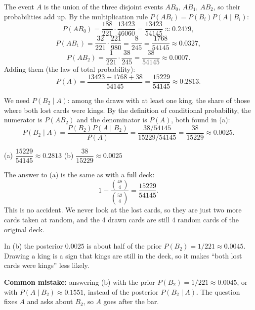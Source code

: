 \begin{solution}
	 The event $A$ is the union of the three disjoint events $AB_0$,
	$AB_1$, $AB_2$, so their probabilities add up. By the multiplication rule
	$P(AB_i)=P(B_i)P(A\mid B_i)$:
	\[ P(AB_0)=\frac{188}{221}\cdot\frac{13423}{46060}=\frac{13423}{54145}\approx0.2479, \]
	\[ P(AB_1)=\frac{32}{221}\cdot\frac{221}{980}=\frac{8}{245}=\frac{1768}{54145}\approx0.0327, \]
	\[ P(AB_2)=\frac{1}{221}\cdot\frac{38}{245}=\frac{38}{54145}\approx0.0007. \]
	Adding them (the law of total probability):
	\[ P(A)=\frac{13423+1768+38}{54145}=\frac{15229}{54145}\approx0.2813. \]

	 We need $P(B_2\mid A)$: among the draws with at least one king,
	the share of those where both lost cards were kings. By the definition of
	conditional probability, the numerator is $P(AB_2)$ and the denominator is
	$P(A)$, both found in (a):
	\[ P(B_2\mid A)=\frac{P(B_2)P(A\mid B_2)}{P(A)}
		=\frac{38/54145}{15229/54145}=\frac{38}{15229}\approx0.0025. \]

	\begin{answer}
		(a) $\dfrac{15229}{54145}\approx0.2813$ \quad
		(b) $\dfrac{38}{15229}\approx0.0025$
	\end{answer}
	\begin{remark}
		The answer to (a) is the same as with a full deck:
		\[ 1-\frac{\binom{48}{4}}{\binom{52}{4}}=\frac{15229}{54145}. \]
		This is no accident. We
		never look at the lost cards, so they are just two more cards taken at
		random, and the 4 drawn cards are still 4 random cards of the original
		deck.

		In (b) the posterior $0.0025$ is about half of the prior
		$P(B_2)=1/221\approx0.0045$. Drawing a king is a sign that kings are
		still in the deck, so it makes ``both lost cards were kings'' less
		likely.

		\textbf{Common mistake:} answering (b) with the prior
		$P(B_2)=1/221\approx0.0045$, or with $P(A\mid B_2)\approx0.1551$,
		instead of the posterior $P(B_2\mid A)$. The question fixes $A$ and asks
		about $B_2$, so $A$ goes after the bar.
	\end{remark}
\end{solution}
